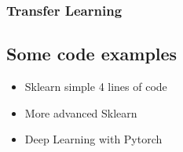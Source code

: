 \subsubsection{Transfer Learning}



\subsection{Some code examples}

\begin{itemize}
   \item Sklearn simple 4 lines of code
   \item More advanced Sklearn
   \item Deep Learning with Pytorch
\end{itemize}



